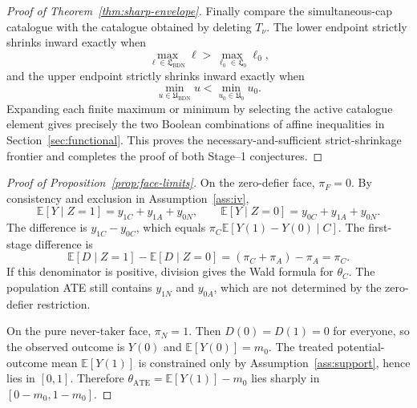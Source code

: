 \documentclass[11pt]{article}
\newcommand{\E}{\mathbb{E}}
\theoremstyle{definition}
\theoremstyle{plain}
\theoremstyle{remark}
\begin{document}
\begin{proof}[Proof of Theorem~\ref{thm:sharp-envelope}]
Finally compare the simultaneous-cap catalogue with the catalogue obtained by
deleting \(T_\nu\).  The lower endpoint strictly shrinks inward exactly when
\[
\max_{\ell\in\mathfrak{L}_{\mathrm{BDN}}}\ell
>
\max_{\ell_0\in\mathfrak{L}_{0}}\ell_0,
\]
and the upper endpoint strictly shrinks inward exactly when
\[
\min_{u\in\mathfrak{U}_{\mathrm{BDN}}}u
<
\min_{u_0\in\mathfrak{U}_{0}}u_0.
\]
Expanding each finite maximum or minimum by selecting the active catalogue
element gives precisely the two Boolean combinations of affine inequalities in
Section~\ref{sec:functional}.  This proves the necessary-and-sufficient
strict-shrinkage frontier and completes the proof of both Stage--1
conjectures.
\end{proof}

\begin{proof}[Proof of Proposition~\ref{prop:face-limits}]
On the zero-defier face, \(\pi_F=0\).  By consistency and exclusion in
Assumption~\ref{ass:iv},
\[
\E[Y\mid Z=1]=y_{1C}+y_{1A}+y_{0N},
\qquad
\E[Y\mid Z=0]=y_{0C}+y_{1A}+y_{0N}.
\]
The difference is \(y_{1C}-y_{0C}\), which equals
\(\pi_C\E[Y(1)-Y(0)\mid C]\).  The first-stage difference is
\[
\E[D\mid Z=1]-\E[D\mid Z=0]
=(\pi_C+\pi_A)-\pi_A=\pi_C.
\]
If this denominator is positive, division gives the Wald formula for
\(\theta_C\).  The population ATE still contains \(y_{1N}\) and \(y_{0A}\),
which are not determined by the zero-defier restriction.

On the pure never-taker face, \(\pi_N=1\).  Then \(D(0)=D(1)=0\) for everyone,
so the observed outcome is \(Y(0)\) and \(\E[Y(0)]=m_0\).  The treated
potential-outcome mean \(\E[Y(1)]\) is constrained only by
Assumption~\ref{ass:support}, hence lies in \([0,1]\).  Therefore
\(\theta_{\mathrm{ATE}}=\E[Y(1)]-m_0\) lies sharply in
\([0-m_0,1-m_0]\).
\end{proof}
\end{document}
